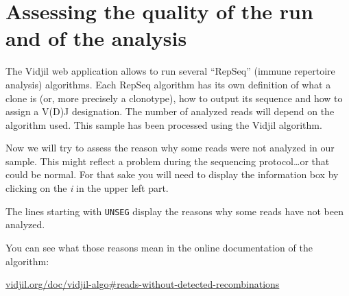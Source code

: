 
\section{Assessing the quality of the run and of the analysis}
The Vidjil web application allows to run several ``RepSeq'' (immune repertoire analysis) algorithms.
Each RepSeq algorithm has its own definition of what a clone is (or, more precisely
a clonotype), how to output its sequence and how to assign a V(D)J designation.
The number of analyzed reads will depend on the algorithm used.
This sample has been processed using the Vidjil algorithm.




Now we will try to assess the reason why some reads were not analyzed in our
sample.
This might reflect a problem during the sequencing protocol\dots or that could
be normal.
For that sake you will need to display the information box by clicking on the
\textit{i} in the upper left part.


The lines starting with \texttt{UNSEG} display the reasons why some reads have
not been analyzed.

You can see what those reasons mean in the online documentation of the
algorithm:

 \centerline{\href{http://www.vidjil.org/doc/vidjil-algo/\#reads-without-detected-recombinations}{vidjil.org/doc/vidjil-algo\#reads-without-detected-recombinations}}



